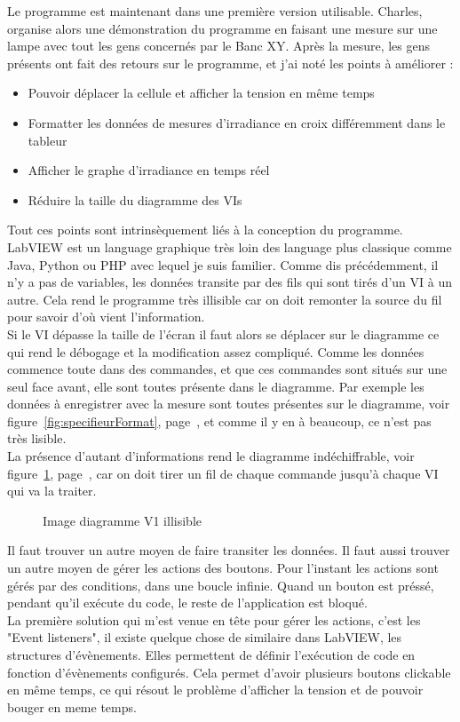 \documentclass[12pt]{article}
\begin{document}
Le programme est maintenant dans une première version utilisable.
Charles, organise alors une démonstration du programme en faisant une mesure sur une lampe avec tout les gens concernés par le Banc XY.
Après la mesure, les gens présents ont fait des retours sur le programme, et j'ai noté les points à améliorer :
\begin{itemize}
	\item Pouvoir déplacer la cellule et afficher la tension en même temps
	\item Formatter les données de mesures d'irradiance en croix différemment dans le tableur
	\item Afficher le graphe d'irradiance en temps réel
	\item Réduire la taille du diagramme des VIs
\end{itemize}
Tout ces points sont intrinsèquement liés à la conception du programme.\\
LabVIEW est un language graphique très loin des language plus classique comme Java, Python ou PHP avec lequel je suis familier.
Comme dis précédemment, il n'y a pas de variables, les données transite par des fils qui sont tirés d'un VI à un autre.
Cela rend le programme très illisible car on doit remonter la source du fil pour savoir d'où vient l'information.\\
Si le VI dépasse la taille de l'écran il faut alors se déplacer sur le diagramme ce qui rend le débogage et la modification assez compliqué.
Comme les données commence toute dans des commandes, et que ces commandes sont situés sur une seul face avant, elle sont toutes présente dans le diagramme.
Par exemple les données à enregistrer avec la mesure sont toutes présentes sur le diagramme, voir figure~\ref{fig:specifieurFormat}, page~\pageref{fig:specifieurFormat}, et comme il y en à beaucoup, ce n'est pas très lisible.\\
La présence d'autant d'informations rend le diagramme indéchiffrable, voir figure~\ref{fig:diagrammeV1}, page~\pageref{fig:diagrammeV1}, car on doit tirer un fil de chaque commande jusqu'à chaque VI qui va la traiter.
\begin{figure}[p]
	\centering
	\caption{Image diagramme V1 illisible}
	\label{fig:diagrammeV1}
\end{figure}
Il faut trouver un autre moyen de faire transiter les données.
Il faut aussi trouver un autre moyen de gérer les actions des boutons.
Pour l'instant les actions sont gérés par des conditions, dans une boucle infinie. Quand un bouton est préssé, pendant qu'il exécute du code, le reste de l'application est bloqué.\\
La première solution qui m'est venue en tête pour gérer les actions, c'est les "Event listeners", il existe quelque chose de similaire dans LabVIEW, les structures d'évènements.
Elles permettent de définir l'exécution de code en fonction d'évènements configurés.
Cela permet d'avoir plusieurs boutons clickable en même temps, ce qui résout le problème d'afficher la tension et de pouvoir bouger en meme temps.
\end{document}
